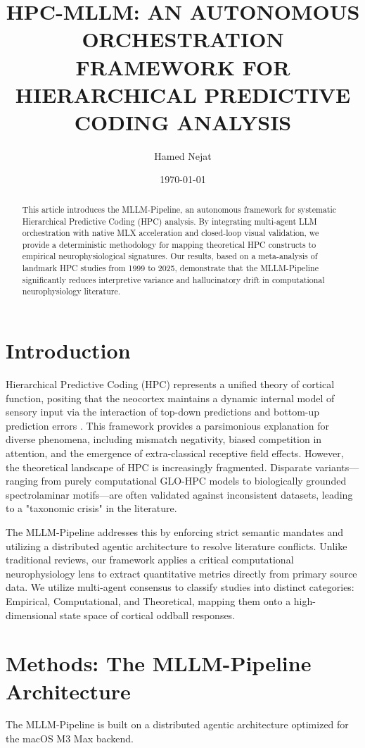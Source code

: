 \documentclass[twocolumn, 10pt]{article}
\title{HPC-MLLM: AN AUTONOMOUS ORCHESTRATION FRAMEWORK FOR HIERARCHICAL PREDICTIVE CODING ANALYSIS}
\author{Hamed Nejat}
\date{\today}
\begin{document}
\maketitle

\begin{abstract}
This article introduces the MLLM-Pipeline, an autonomous framework for systematic Hierarchical Predictive Coding (HPC) analysis. By integrating multi-agent LLM orchestration with native MLX acceleration and closed-loop visual validation, we provide a deterministic methodology for mapping theoretical HPC constructs to empirical neurophysiological signatures. Our results, based on a meta-analysis of landmark HPC studies from 1999 to 2025, demonstrate that the MLLM-Pipeline significantly reduces interpretive variance and hallucinatory drift in computational neurophysiology literature.
\end{abstract}

\section{Introduction}
Hierarchical Predictive Coding (HPC) represents a unified theory of cortical function, positing that the neocortex maintains a dynamic internal model of sensory input via the interaction of top-down predictions and bottom-up prediction errors \cite{Rao1999, Friston2005}. This framework provides a parsimonious explanation for diverse phenomena, including mismatch negativity, biased competition in attention, and the emergence of extra-classical receptive field effects. However, the theoretical landscape of HPC is increasingly fragmented. Disparate variants—ranging from purely computational GLO-HPC models to biologically grounded spectrolaminar motifs—are often validated against inconsistent datasets, leading to a "taxonomic crisis" in the literature.

The MLLM-Pipeline addresses this by enforcing strict semantic mandates and utilizing a distributed agentic architecture to resolve literature conflicts. Unlike traditional reviews, our framework applies a critical computational neurophysiology lens to extract quantitative metrics directly from primary source data. We utilize multi-agent consensus to classify studies into distinct categories: Empirical, Computational, and Theoretical, mapping them onto a high-dimensional state space of cortical oddball responses.

\lipsum[1-5] %

\section{Methods: The MLLM-Pipeline Architecture}
The MLLM-Pipeline is built on a distributed agentic architecture optimized for the macOS M3 Max backend.
\end{document}
